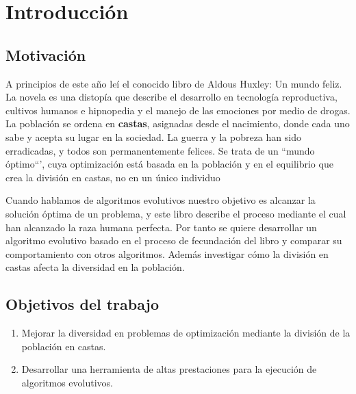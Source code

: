 \chapter{Introducción}

\section{Motivación}

A principios de este año leí el conocido libro de Aldous Huxley: Un mundo feliz. La novela es una
distopía que describe el desarrollo en tecnología reproductiva, cultivos humanos e hipnopedia y el manejo de las
emociones por medio de drogas. La población se ordena en \textbf{castas}, asignadas desde el nacimiento, donde cada uno
sabe y acepta su lugar en la sociedad. La guerra y la pobreza han sido erradicadas, y todos son permanentemente
felices. Se trata de un ``mundo óptimo``', cuya optimización está basada en la población y en el equilibrio que crea
la división en castas, no en un único individuo 

Cuando hablamos de algoritmos evolutivos nuestro objetivo es alcanzar la solución óptima de un problema, y este libro describe el 
proceso mediante el cual han alcanzado la raza humana perfecta. Por tanto se quiere desarrollar un algoritmo evolutivo basado en 
el proceso de fecundación del libro y comparar su comportamiento con otros algoritmos. Además investigar cómo la división en castas afecta 
la diversidad en la población.

\section{Objetivos del trabajo}

\begin{enumerate}
    \item Mejorar la diversidad en problemas de optimización mediante la división de la población en castas.
    \item Desarrollar una herramienta de altas prestaciones para la ejecución de algoritmos evolutivos.
\end{enumerate}